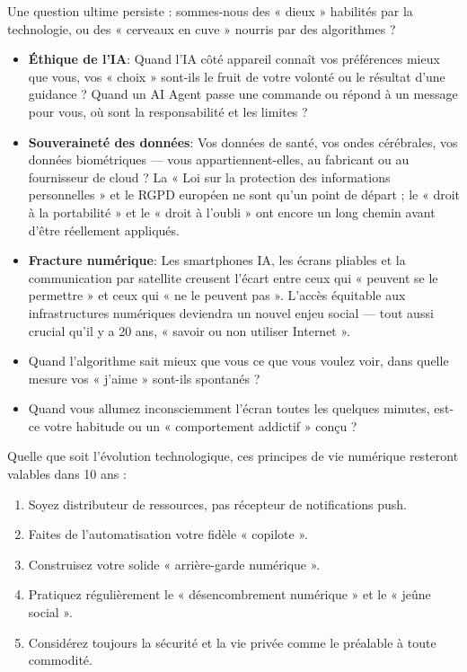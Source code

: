 
Une question ultime persiste : sommes-nous des « dieux » habilités par la technologie, ou des « cerveaux en cuve » nourris par des algorithmes ?

\begin{itemize}
  \item \textbf{Éthique de l'IA}: Quand l'IA côté appareil connaît vos préférences mieux que vous, vos « choix » sont-ils le fruit de votre volonté ou le résultat d'une guidance ? Quand un AI Agent passe une commande ou répond à un message pour vous, où sont la responsabilité et les limites ?
  \item \textbf{Souveraineté des données}: Vos données de santé, vos ondes cérébrales, vos données biométriques — vous appartiennent-elles, au fabricant ou au fournisseur de cloud ? La « Loi sur la protection des informations personnelles » et le RGPD européen ne sont qu'un point de départ ; le « droit à la portabilité » et le « droit à l'oubli » ont encore un long chemin avant d'être réellement appliqués.
  \item \textbf{Fracture numérique}: Les smartphones IA, les écrans pliables et la communication par satellite creusent l'écart entre ceux qui « peuvent se le permettre » et ceux qui « ne le peuvent pas ». L'accès équitable aux infrastructures numériques deviendra un nouvel enjeu social — tout aussi crucial qu'il y a 20 ans, « savoir ou non utiliser Internet ».
  \item Quand l'algorithme sait mieux que vous ce que vous voulez voir, dans quelle mesure vos « j'aime » sont-ils spontanés ?
  \item Quand vous allumez inconsciemment l'écran toutes les quelques minutes, est-ce votre habitude ou un « comportement addictif » conçu ?
\end{itemize}


Quelle que soit l'évolution technologique, ces principes de vie numérique resteront valables dans 10 ans :

\begin{enumerate}
  \item Soyez distributeur de ressources, pas récepteur de notifications push.
  \item Faites de l'automatisation votre fidèle « copilote ».
  \item Construisez votre solide « arrière-garde numérique ».
  \item Pratiquez régulièrement le « désencombrement numérique » et le « jeûne social ».
  \item Considérez toujours la sécurité et la vie privée comme le préalable à toute commodité.
\end{enumerate}

